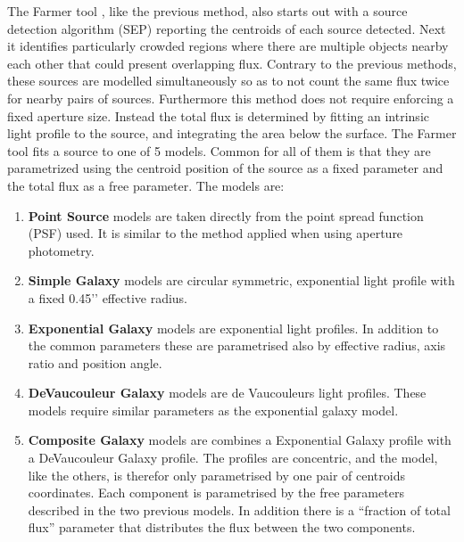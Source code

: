 The Farmer tool \cite{Weaver_2020}, like the previous method, also starts out with a source detection algorithm (SEP) reporting the centroids of each source detected. Next it identifies particularly crowded regions where there are multiple objects nearby each other that could present overlapping flux. Contrary to the previous methods, these sources are modelled simultaneously so as to not count the same flux twice for nearby pairs of sources. Furthermore this method does not require enforcing a fixed aperture size. Instead the total flux is determined by fitting an intrinsic light profile to the source, and integrating the area below the surface. The Farmer tool fits a source to one of 5 models. Common for all of them is that they are parametrized using the centroid position of the source as a fixed parameter and the total flux as a free parameter. The models are:
\begin{enumerate}
    \item \textbf{Point Source} models are taken directly from the point spread function (PSF) used. It is similar to the method applied when using aperture photometry.
    \item \textbf{Simple Galaxy} models are circular symmetric, exponential light profile with a fixed 0.45’’ effective radius.
    \item \textbf{Exponential Galaxy} models are exponential light profiles. In addition to the common parameters these are parametrised also by effective radius, axis ratio and position angle.
    \item \textbf{DeVaucouleur Galaxy} models are de Vaucouleurs light profiles. These models require similar parameters as the exponential galaxy model.
    \item \textbf{Composite Galaxy} models are combines a Exponential Galaxy profile with a DeVaucouleur Galaxy profile. The profiles are concentric, and the model, like the others, is therefor only parametrised by one pair of centroids coordinates. Each component is parametrised by the free parameters described in the two previous models. In addition there is a “fraction of total flux” parameter that distributes the flux between the two components.
\end{enumerate}


